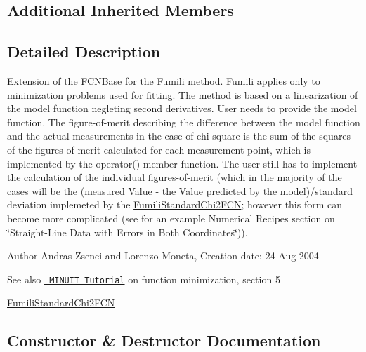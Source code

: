 \subsection*{Additional Inherited Members}


\subsection{Detailed Description}
Extension of the \mbox{\hyperlink{classROOT_1_1Minuit2_1_1FCNBase}{F\+C\+N\+Base}} for the Fumili method. Fumili applies only to minimization problems used for fitting. The method is based on a linearization of the model function negleting second derivatives. User needs to provide the model function. The figure-\/of-\/merit describing the difference between the model function and the actual measurements in the case of chi-\/square is the sum of the squares of the figures-\/of-\/merit calculated for each measurement point, which is implemented by the operator() member function. The user still has to implement the calculation of the individual figures-\/of-\/merit (which in the majority of the cases will be the (measured Value -\/ the Value predicted by the model)/standard deviation implemeted by the \mbox{\hyperlink{classROOT_1_1Minuit2_1_1FumiliStandardChi2FCN}{Fumili\+Standard\+Chi2\+F\+CN}}; however this form can become more complicated (see for an example Numerical Recipes\textquotesingle{} section on \char`\"{}\+Straight-\/\+Line Data with Errors in Both Coordinates\char`\"{})).

\begin{DoxyAuthor}{Author}
Andras Zsenei and Lorenzo Moneta, Creation date\+: 24 Aug 2004
\end{DoxyAuthor}
\begin{DoxySeeAlso}{See also}
\href{http://www.cern.ch/winkler/minuit/tutorial/mntutorial.pdf}{\texttt{ M\+I\+N\+U\+IT Tutorial}} on function minimization, section 5

\mbox{\hyperlink{classROOT_1_1Minuit2_1_1FumiliStandardChi2FCN}{Fumili\+Standard\+Chi2\+F\+CN}} 
\end{DoxySeeAlso}


\subsection{Constructor \& Destructor Documentation}
\mbox{\label{classROOT_1_1Minuit2_1_1FumiliChi2FCN_ae0918088996b787c67bdbe0b79b134cb}} 
